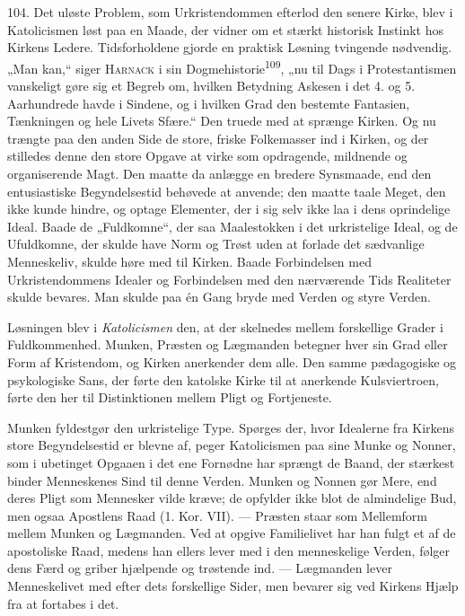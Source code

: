 \documentclass[12pt,a4paper,openany]{book}
\newcommand{\opage}[1]{\marginnote{\footnotesize\textit{[#1]}}}
\begin{document}
104. Det uløste Problem, som Urkristendommen efterlod den senere Kirke,
blev i Katolicismen løst paa en Maade, der vidner om et stærkt historisk
Instinkt hos Kirkens Ledere. Tidsforholdene gjorde en praktisk Løsning
tvingende nødvendig. „Man kan,“ siger \textsc{Harnack} i sin
Dogmehistorie\textsuperscript{109}, „nu til Dags i Protestantismen
vanskeligt gøre sig et Begreb om, hvilken Betydning Askesen i det 4. og
5. Aarhundrede havde i Sindene, og i hvilken Grad den bestemte
Fantasien, Tænkningen og hele Livets Sfære.“ Den truede med at sprænge
Kirken. Og nu trængte paa den anden Side de store, friske Folkemasser
ind i Kirken, og der stilledes denne den store Opgave at virke som
opdragende, mildnende og organiserende Magt. Den maatte da anlægge en
bredere Synsmaade, end den entusiastiske Begyndelsestid behøvede at
anvende; den maatte taale Meget, den ikke kunde hindre, og optage
Elementer, der i sig selv ikke laa i dens oprindelige Ideal. Baade de
„Fuldkomne“, der saa Maalestokken i det urkristelige Ideal, og de
Ufuldkomne, der skulde have Norm og Trøst uden at forlade det sædvanlige
Menneskeliv, skulde høre med til Kirken. Baade Forbindelsen med
Urkristendommens Idealer og Forbindelsen med den nærværende Tids
Realiteter skulde bevares. Man skulde paa én Gang bryde med Verden og
styre Verden.

Løsningen blev i \textit{Katolicismen} den, at der skelnedes mellem
forskellige Grader i Fuldkommenhed. Munken, Præsten og Lægmanden
betegner hver sin Grad eller Form af Kristendom, og Kirken anerkender
dem alle. Den samme pædagogiske og psykologiske Sans, der førte den
katolske Kirke til at anerkende Kulsviertroen, førte den her til
Distinktionen mellem Pligt og Fortjeneste.

Munken fyldestgør den urkristelige Type. Spørges der, hvor Idealerne fra
Kirkens store Begyndelsestid er blevne af, peger Katolicismen paa sine
Munke og Nonner, som i ubetinget Opgaaen i det ene Fornødne har sprængt
de Baand, der stærkest binder Menneskenes Sind til denne Verden. Munken
og Nonnen gør Mere, end deres Pligt som Mennesker vilde kræve; de
opfylder ikke blot de almindelige Bud, men ogsaa Apostlens Raad (1. Kor.
VII). --- Præsten staar som Mellemform mellem Munken og Lægmanden. Ved
at opgive Familielivet har han fulgt et af de apostoliske Raad, medens
han ellers lever med i den menneskelige Verden, følger dens Færd og
griber hjælpende og trøstende
\opage{233}ind. --- Lægmanden lever Menneskelivet med efter dets
forskellige Sider, men bevarer sig ved Kirkens Hjælp fra at fortabes i
det.
\end{document}
